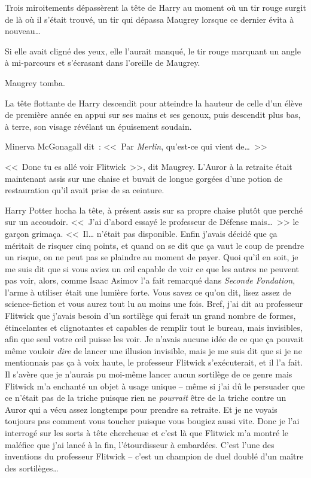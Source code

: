 Trois miroitements dépassèrent la tête de Harry au moment où un tir rouge surgit de là où il s'était trouvé, un tir qui dépassa Maugrey lorsque ce dernier évita à nouveau…

Si elle avait cligné des yeux, elle l'aurait manqué, le tir rouge marquant un angle à mi-parcours et s'écrasant dans l'oreille de Maugrey.

Maugrey tomba.

La tête flottante de Harry descendit pour atteindre la hauteur de celle d'un élève de première année en appui sur ses mains et ses genoux, puis descendit plus bas, à terre, son visage révélant un épuisement soudain.

Minerva McGonagall dit~: <<~Par \emph{Merlin}, qu'est-ce qui vient de…~>>

\later

<<~Donc tu es allé voir Flitwick~>>, dit Maugrey. L'Auror à la retraite était maintenant assis sur une chaise et buvait de longue gorgées d'une potion de restauration qu'il avait prise de sa ceinture.

Harry Potter hocha la tête, à présent assis sur sa propre chaise plutôt que perché sur un accoudoir. <<~J'ai d'abord essayé le professeur de Défense mais…~>> le garçon grimaça. <<~Il… n'était pas disponible. Enfin j'avais décidé que ça méritait de risquer cinq points, et quand on se dit que ça vaut le coup de prendre un risque, on ne peut pas se plaindre au moment de payer. Quoi qu'il en soit, je me suis dit que si vous aviez un œil capable de voir ce que les autres ne peuvent pas voir, alors, comme Isaac Asimov l'a fait remarqué dans \emph{Seconde Fondation}, l'arme à utiliser était une lumière forte. Vous savez ce qu'on dit, lisez assez de science-fiction et vous aurez tout lu au moins une fois. Bref, j'ai dit au professeur Flitwick que j'avais besoin d'un sortilège qui ferait un grand nombre de formes, étincelantes et clignotantes et capables de remplir tout le bureau, mais invisibles, afin que seul votre œil puisse les voir. Je n'avais aucune idée de ce que ça pouvait même vouloir \emph{dire} de lancer une illusion invisible, mais je me suis dit que si je ne mentionnais pas ça à voix haute, le professeur Flitwick s'exécuterait, et il l'a fait. Il s'avère que je n'aurais pu moi-même lancer aucun sortilège de ce genre mais Flitwick m'a enchanté un objet à usage unique -- même si j'ai dû le persuader que ce n'était pas de la triche puisque rien ne \emph{pourrait} être de la triche contre un Auror qui a vécu assez longtemps pour prendre sa retraite. Et je ne voyais toujours pas comment vous toucher puisque vous bougiez aussi vite. Donc je l'ai interrogé sur les sorts à tête chercheuse et c'est là que Flitwick m'a montré le maléfice que j'ai lancé à la fin, l'étourdisseur à embardées. C'est l'une des inventions du professeur Flitwick -- c'est un champion de duel doublé d'un maître des sortilèges…

